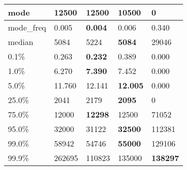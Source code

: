 \begin{table}[H]
\begin{tabular}{|l|m{10em}|m{10em}|m{10em}|m{10em}|}
\hline mode & 12500 & \bfseries 12500 & 10500 & \cellcolor[rgb]{0.9, 0.54, 0.52} 0 \\
\hline mode\_freq & 0.005 & \bfseries 0.004 & 0.006 & \cellcolor[rgb]{0.9, 0.54, 0.52} 0.340 \\
\hline median & 5084 & 5224 & \bfseries 5084 & \cellcolor[rgb]{0.9, 0.54, 0.52} 29046 \\
\hline 0.1\% & 0.263 & \bfseries 0.232 & 0.389 & \cellcolor[rgb]{0.9, 0.54, 0.52} 0.000 \\
\hline 1.0\% & 6.270 & \bfseries 7.390 & 7.452 & \cellcolor[rgb]{0.9, 0.54, 0.52} 0.000 \\
\hline 5.0\% & 11.760 & 12.141 & \bfseries 12.005 & \cellcolor[rgb]{0.9, 0.54, 0.52} 0.000 \\
\hline 25.0\% & 2041 & 2179 & \bfseries 2095 & \cellcolor[rgb]{0.9, 0.54, 0.52} 0 \\
\hline 75.0\% & 12000 & \bfseries 12298 & 12500 & \cellcolor[rgb]{0.9, 0.54, 0.52} 71052 \\
\hline 95.0\% & 32000 & 31122 & \bfseries 32500 & \cellcolor[rgb]{0.9, 0.54, 0.52} 112381 \\
\hline 99.0\% & 58942 & 54746 & \bfseries 55000 & \cellcolor[rgb]{0.9, 0.54, 0.52} 129106 \\
\hline 99.9\% & 262695 & \cellcolor[rgb]{0.9, 0.54, 0.52} 110823 & 135000 & \bfseries 138297 \\
\hline
\end{tabular}
\end{table}
